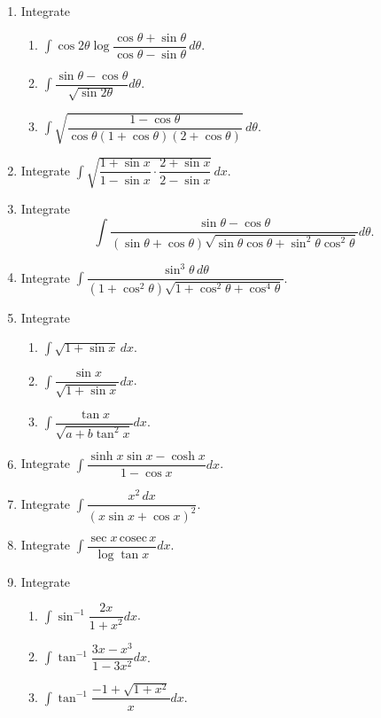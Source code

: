 \documentclass[11pt, a4paper]{article}
\begin{document}
\begin{enumerate}[leftmargin=2em]
\item Integrate
\begin{enumerate}[label=(\roman*)]
\item $\displaystyle\int \cos2\theta\log\dfrac{\cos\theta+\sin\theta}{\cos\theta-\sin\theta}\,d\theta$.
\item $\displaystyle\int \dfrac{\sin\theta-\cos\theta}{\sqrt{\sin2\theta}}d\theta$.
\item $\displaystyle\int \sqrt{\dfrac{1-\cos\theta}{\cos\theta(1+\cos\theta)(2+\cos\theta)}}\,d\theta$.
\end{enumerate}

\item Integrate $\displaystyle\int \sqrt{\dfrac{1+\sin x}{1-\sin x}\cdot\dfrac{2+\sin x}{2-\sin x}}\,dx$.

\item Integrate
\[
\int \dfrac{\sin\theta-\cos\theta}{(\sin\theta+\cos\theta)\sqrt{\sin\theta\cos\theta+\sin^2\theta\cos^2\theta}}d\theta.
\]

\item Integrate $\displaystyle\int \dfrac{\sin^3\theta\,d\theta}{(1+\cos^2\theta)\sqrt{1+\cos^2\theta+\cos^4\theta}}$.

\item Integrate
\begin{enumerate}[label=(\roman*)]
\item $\displaystyle\int \sqrt{1+\sin x}\,dx$.
\item $\displaystyle\int \dfrac{\sin x}{\sqrt{1+\sin x}}dx$.
\item $\displaystyle\int \dfrac{\tan x}{\sqrt{a+b\tan^2x}}dx$.
\end{enumerate}

\item Integrate $\displaystyle\int \dfrac{\sinh x\sin x-\cosh x}{1-\cos x}dx$.

\item Integrate $\displaystyle\int \dfrac{x^2\,dx}{(x\sin x+\cos x)^2}$.

\item Integrate $\displaystyle\int \dfrac{\sec x\,\text{cosec}\,x}{\log\tan x}dx$.

\item Integrate
\begin{enumerate}[label=(\roman*)]
\item $\displaystyle\int \sin^{-1}\dfrac{2x}{1+x^2}dx$.
\item $\displaystyle\int \tan^{-1}\dfrac{3x-x^3}{1-3x^2}dx$.
\item $\displaystyle\int \tan^{-1}\dfrac{-1+\sqrt{1+x^2}}{x}dx$.
\end{enumerate}


\end{enumerate}
\end{document}

